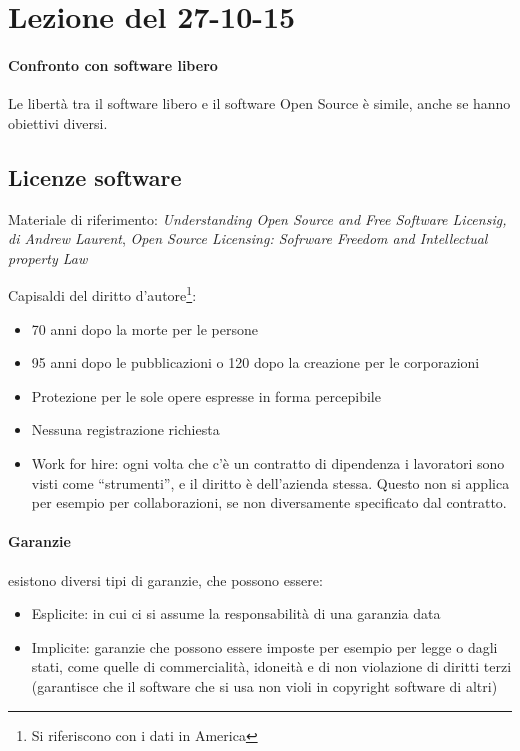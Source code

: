 \section{Lezione del 27-10-15}
\graphicspath{ {res/data/27-10-15/} }

\paragraph*{Confronto con software libero} Le libert\`a tra il software libero e il software Open Source \`e simile, anche se hanno obiettivi diversi.

\subsection{Licenze software}

Materiale di riferimento: \textit{Understanding Open Source and Free Software Licensig, di Andrew Laurent}, \textit{Open Source Licensing: Sofrware Freedom and Intellectual property Law}

Capisaldi del diritto d'autore\footnote{Si riferiscono con i dati in America}:
\begin{itemize}
\item 70 anni dopo la morte per le persone
\item 95 anni dopo le pubblicazioni o 120 dopo la creazione per le corporazioni
\item Protezione per le sole opere espresse in forma percepibile
\item Nessuna registrazione richiesta
\item Work for hire: ogni volta che c'\`e un contratto di dipendenza i lavoratori sono visti come ``strumenti'', e il diritto \`e dell'azienda stessa. Questo non si applica per esempio per collaborazioni, se non diversamente specificato dal contratto.
\end{itemize}

\paragraph*{Garanzie} esistono diversi tipi di garanzie, che possono essere:
\begin{itemize}
\item Esplicite: in cui ci si assume la responsabilit\`a di una garanzia data
\item Implicite: garanzie che possono essere imposte per esempio per legge o dagli stati, come quelle di commercialit\`a, idoneit\`a e di non violazione di diritti terzi (garantisce che il software che si usa non violi in copyright software di altri)
\end{itemize}

